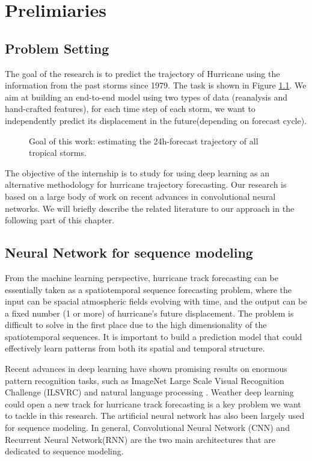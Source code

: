 \chapter{Prelimiaries}

\section{Problem Setting}
The goal of the research is to predict the trajectory of Hurricane using the information from the past storms since 1979. The task is shown in Figure \ref{fig::task}. We aim at building an end-to-end model using two types of data (reanalysis and hand-crafted features), for each time step of each storm, we want to independently predict its displacement in the future(depending on forecast cycle). 

\begin{figure}[H]
	\begin{center}
		\hsize {}
	\end{center}
	\caption{Goal of this work: estimating the 24h-forecast trajectory of all tropical storms.}
	\label{fig::task}
\end{figure}

The objective of the internship is to study for using deep learning as an alternative methodology for hurricane trajectory forecasting. Our research is based on a large body of work on recent advances in convolutional neural networks. We will briefly describe the related literature to our approach in the following part of this chapter.  

\section{Neural Network for sequence modeling}
From the machine learning perspective, hurricane track forecasting can be essentially taken as a spatiotemporal sequence forecasting problem, where the input can be spacial atmospheric fields evolving with time, and the output can be a fixed number (1 or more) of hurricane's future displacement. The problem is difficult to solve in the first place due to the high dimensionality of the spatiotemporal sequences. It is important to build a prediction model that could effectively learn patterns from both its spatial and temporal structure. 

Recent advances in deep learning have shown promising results on enormous pattern recognition tasks, such as ImageNet Large Scale Visual Recognition Challenge (ILSVRC) \cite{russakovsky2015imagenet} \cite{krizhevsky2012imagenet}  \cite{szegedy2015going} and natural language processing \cite{goldberg2014word2vec} \cite{sutskever2014sequence}. Weather deep learning could open a new track for hurricane track forecasting is a key problem we want to tackle in this research. The artificial neural network has also been largely used for sequence modeling. In general, Convolutional Neural Network (CNN) and Recurrent Neural Network(RNN) are the two main architectures that are dedicated to sequence modeling. 

